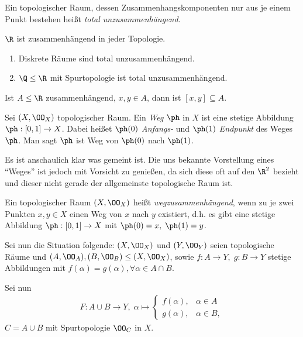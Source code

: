 \begin{defn}
\label{defn:2.2.15}
Ein topologischer Raum, dessen Zusammenhangskomponenten nur aus je einem Punkt
bestehen heißt \emph{total unzusammenhängend}.\fishhere
\end{defn}
\begin{bspn}
$\R$ ist zusammenhängend in jeder Topologie.\bsphere
\end{bspn}

\begin{bem}
\label{bem:2.2.16}
\begin{enumerate}
  \item Diskrete Räume sind total unzusammenhängend.
  \item $\Q\le\R$ mit Spurtopologie ist total unzusammenhängend.\maphere
\end{enumerate}
\end{bem}

\begin{prop}[Übung]
\label{prop:2.2.17}
Ist $A\le\R$ zusammenhängend, $x,y\in A$, dann ist $[x,y]\subseteq A$.\fishhere 
\end{prop}

\begin{defn}
\label{defn:2.2.18}
Sei $(X,\OO_X)$ topologischer Raum. Ein \emph{Weg} $\ph$ in $X$ ist eine stetige
Abbildung $\ph: [0,1]\to X$. Dabei heißet $\ph(0)$ \emph{Anfangs-} und $\ph(1)$
\emph{Endpunkt} des Weges $\ph$. Man sagt $\ph$ ist Weg von $\ph(0)$ nach
$\ph(1)$.\fishhere
\end{defn}

Es ist anschaulich klar was gemeint ist. Die uns bekannte Vorstellung eines
``Weges'' ist jedoch mit Vorsicht zu genießen, da sich diese oft auf den $\R^2$
bezieht und dieser nicht gerade der allgemeinste topologische Raum ist.

\begin{defn}
\label{defn:2.2.19}
Ein topologischer Raum $(X,\OO_X)$ heißt \emph{wegzusammenhängend}, wenn zu je
zwei Punkten $x,y\in X$ einen Weg von $x$ nach $y$ existiert, d.h. es gibt eine
stetige Abbildung $\ph: [0,1]\to X$ mit $\ph(0) = x,\;\ph(1)=y$.\fishhere
\end{defn}

Sei nun die Situation folgende: $(X,\OO_X)$ und $(Y,\OO_Y)$ seien topologische
Räume und $(A,\OO_A),(B,\OO_B)\le (X,\OO_X)$, sowie $f: A\to Y,\; g: B\to Y$
stetige Abbildungen mit $f(\alpha) = g(\alpha), \forall \alpha\in A\cap B$.

Sei nun
\begin{align*}
F: A\cup B \to Y,\; \alpha\mapsto\begin{cases}
                                 f(\alpha),& \alpha\in A\\
                                 g(\alpha),& \alpha\in B,
                                 \end{cases}
\end{align*}
$C=A\cup B$ mit Spurtopologie $\OO_C$ in $X$.

